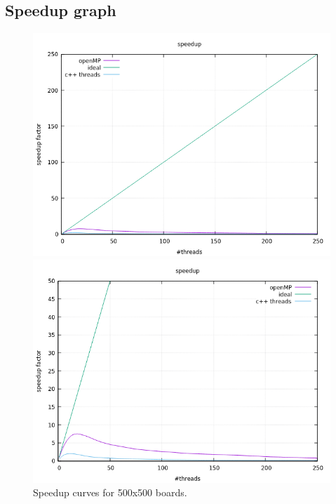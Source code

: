 \documentclass[a4paper,10pt]{article}
\begin{document}
	\subsection{Speedup graph}
	\begin{figure}[H]
		\centering
		\begin{minipage}[t]{0.55\linewidth}
			\includegraphics[width=\linewidth]{BenchMarkGOL/speedup/500/graph500.png}
		\end{minipage}%
		\begin{minipage}[t]{0.55\linewidth}
			\includegraphics[width=\linewidth]{BenchMarkGOL/speedup/500/graph500_zoom.png}
		\end{minipage}
		\caption{Speedup curves for 500x500 boards.}
		\label{500}
	\end{figure}
\end{document}
